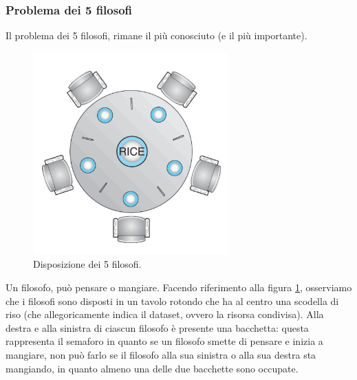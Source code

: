 \subsubsection{Problema dei 5 filosofi}\label{5_filosofi}
Il problema dei 5 filosofi, rimane il più conosciuto (e il più importante).
\begin{figure}[t!]
    \centering
    \includegraphics[width = .5\textwidth]{../res/imgs/synchronization/5_filosofi.png}
    \caption{Disposizione dei 5 filosofi.}
    \label{fig:5_filosofi}
\end{figure}
Un filosofo, può pensare o mangiare. Facendo riferimento alla figura \ref{fig:5_filosofi}, osserviamo che i filosofi sono disposti in un tavolo rotondo che ha al centro una scodella di riso (che allegoricamente indica il dataset, ovvero la risorsa condivisa). Alla destra e alla sinistra di ciascun filosofo è presente una bacchetta: questa rappresenta il semaforo in quanto se un filosofo smette di pensare e inizia a mangiare, non può farlo se il filosofo alla sua sinistra o alla sua destra sta mangiando, in quanto almeno una delle due bacchette sono occupate.

